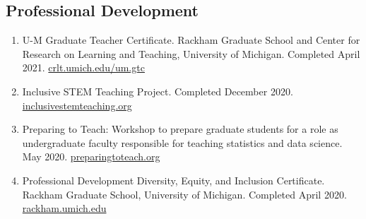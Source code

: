 \documentclass[letterpaper,11pt]{article} %
\begin{document}
	\subsection*{Professional Development}
	
	\renewcommand{\arraystretch}{1.25}
	\begin{enumerate}
		\item U-M Graduate Teacher Certificate. Rackham Graduate School and Center for Research on Learning and Teaching, University of Michigan. Completed April 2021. \href{https://crlt.umich.edu/um.gtc/description}{crlt.umich.edu/um.gtc} 
		\item Inclusive STEM Teaching Project. Completed December 2020. \href{https://www.inclusivestemteaching.org/}{inclusivestemteaching.org}
		\item Preparing to Teach: Workshop to prepare graduate students for a role as undergraduate faculty responsible for teaching statistics and data science. May 2020. \href{https://preparingtoteach.org/}{preparingtoteach.org}
		\item Professional Development Diversity, Equity, and Inclusion Certificate. Rackham Graduate School, University of Michigan. Completed April 2020. \href{https://rackham.umich.edu/professional-development/dei-certificate/}{rackham.umich.edu}
	\end{enumerate}
%
\end{document}
